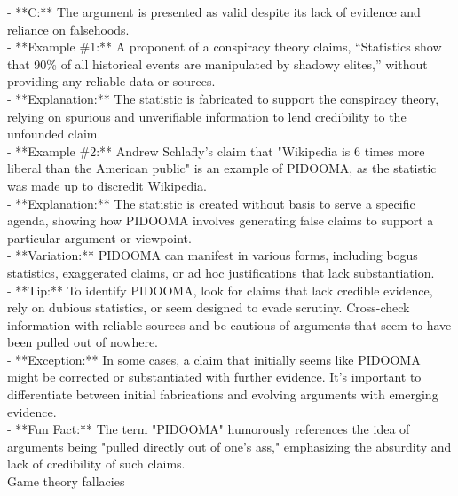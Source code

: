 \documentclass[a4paper,12pt,single,pdftex]{scrartcl}
\begin{document}
    
        - **C:** The argument is presented as valid despite its lack of evidence and reliance on falsehoods.
    \\

    
      - **Example \#1:** A proponent of a conspiracy theory claims, “Statistics show that 90\% of all historical events are manipulated by shadowy elites,” without providing any reliable data or sources.
    \\

    
      - **Explanation:** The statistic is fabricated to support the conspiracy theory, relying on spurious and unverifiable information to lend credibility to the unfounded claim.
    \\

    
      - **Example \#2:** Andrew Schlafly’s claim that "Wikipedia is 6 times more liberal than the American public" is an example of PIDOOMA, as the statistic was made up to discredit Wikipedia.
    \\

    
      - **Explanation:** The statistic is created without basis to serve a specific agenda, showing how PIDOOMA involves generating false claims to support a particular argument or viewpoint.
    \\

    
      - **Variation:** PIDOOMA can manifest in various forms, including bogus statistics, exaggerated claims, or ad hoc justifications that lack substantiation.
    \\

    
      - **Tip:** To identify PIDOOMA, look for claims that lack credible evidence, rely on dubious statistics, or seem designed to evade scrutiny. Cross-check information with reliable sources and be cautious of arguments that seem to have been pulled out of nowhere.
    \\

    
      - **Exception:** In some cases, a claim that initially seems like PIDOOMA might be corrected or substantiated with further evidence. It's important to differentiate between initial fabrications and evolving arguments with emerging evidence.
    \\

    
      - **Fun Fact:** The term "PIDOOMA" humorously references the idea of arguments being "pulled directly out of one's ass," emphasizing the absurdity and lack of credibility of such claims.
    \\

  

Game theory fallacies
\end{document}
